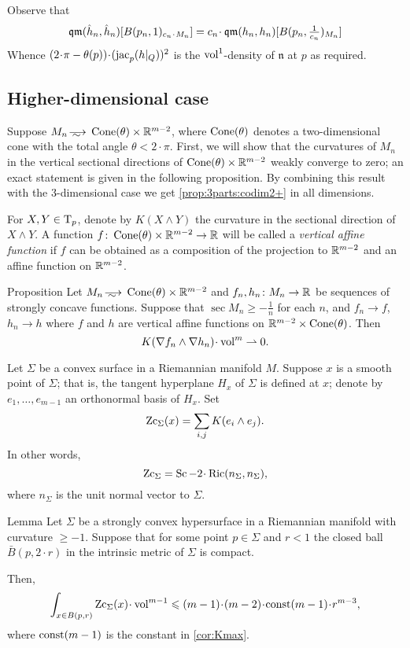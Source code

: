 Observe that 
\[\qm(\hat h_n, \hat h_n)[B(p_n,1)_{c_n\cdot M_n}]
=
c_n\cdot \qm(h_n, h_n)[B(p_n,\tfrac1{c_n})_{M_n}]\]
Whence $(2\cdot \pi-\theta(p))\cdot(\jac_p(h|_Q))^2$ is the $\operatorname{vol}^1$-density of $\mathfrak n$ at $p$ as required.
\qeds

\subsection{Higher-dimensional case}


Suppose $M_n\smooths{} \Cone(\theta)\times \RR^{m-2}$, where $\operatorname{Cone}(\theta)$ denotes a two-dimensional cone with the total angle $\theta<2\cdot\pi$.
First, we will show that the curvatures of $M_n$ in the vertical sectional directions of $\operatorname{Cone}(\theta)\times \mathbb{R}^{m-2}$ weakly converge to zero;
an exact statement is given in the following proposition.
By combining this result with the 3-dimensional case we get \ref{prop:3parts:codim2+} in all dimensions.

For $X,Y\in \mathrm{T}_p$, denote by $K(X\wedge Y)$ the curvature in the sectional direction of $X\wedge Y$.
A function $f\colon\operatorname{Cone}(\theta)\times\mathbb{R}^{m-2}\to\mathbb{R}$ will be called a \emph{vertical affine function} if $f$ can be obtained as a composition of the projection to $\mathbb{R}^{m-2}$ and an affine function on $\mathbb{R}^{m-2}$.

\begin{thm}{Proposition}\label{prop:vert-vert}
Let $M_n\smooths{} \Cone(\theta)\times\RR^{m-2}$
and $f_n,h_n\: M_n\zz\to \RR$ be sequences of strongly concave functions.
Suppose that $\sec M_n\ge -\tfrac1n$ for each $n$,
and $f_n\to f$, 
$h_n\to h$ where $f$ and $h$ are vertical affine functions on $\mathbb{R}^{m-2}\times \operatorname{Cone}(\theta)$.
Then 
\[K(\nabla f_n\wedge\nabla h_n)\cdot\vol^m \rightharpoonup0.\]

\end{thm}

Let $\Sigma$ be a convex surface in a Riemannian manifold $M$.
Suppose $x$ is a smooth point of $\Sigma$; that is, the tangent hyperplane $H_x$ of $\Sigma$ is defined at $x$;
denote by $e_1,\dots,e_{m-1}$ an orthonormal basis of $H_x$.
Set 
\[\operatorname{\rm Zc}_\Sigma(x)= \sum_{i,j} K(e_i\wedge e_j).\]
In other words, 
\[\Zc_\Sigma=\Sc-2\cdot\Ric(n_\Sigma,n_\Sigma),\]
where $n_\Sigma$ is the unit normal vector to $\Sigma$.

\begin{thm}{Lemma}\label{lem:nonsmooth-convex}
Let $\Sigma$ be a strongly convex hypersurface in a Riemannian manifold with curvature $\ge -1$.
Suppose that for some point $p\in \Sigma$ and $r<1$ the closed ball $\bar B(p,2\cdot r)$ in the intrinsic metric of $\Sigma$ is compact.

Then, 
\[\int_{x\in B(p,r)}\Zc_\Sigma(x)\cdot \vol^{m-1}\le (m-1)\cdot(m-2)\cdot\const(m-1)\cdot r^{m-3},\]
where $\mathrm{const}(m-1)$ is the constant in \ref{cor:Kmax}.
\end{thm}

